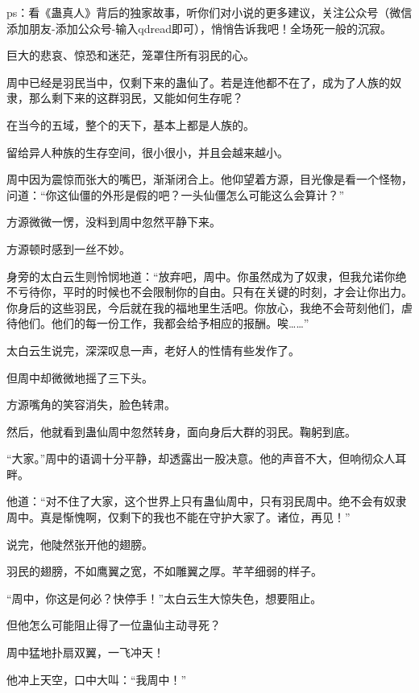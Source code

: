 
\begin{this_body}

ps：看《蛊真人》背后的独家故事，听你们对小说的更多建议，关注公众号（微信添加朋友-添加公众号-输入qdread即可），悄悄告诉我吧！全场死一般的沉寂。

巨大的悲哀、惊恐和迷茫，笼罩住所有羽民的心。

周中已经是羽民当中，仅剩下来的蛊仙了。若是连他都不在了，成为了人族的奴隶，那么剩下来的这群羽民，又能如何生存呢？

在当今的五域，整个的天下，基本上都是人族的。

留给异人种族的生存空间，很小很小，并且会越来越小。

周中因为震惊而张大的嘴巴，渐渐闭合上。他仰望着方源，目光像是看一个怪物，问道：“你这仙僵的外形是假的吧？一头仙僵怎么可能这么会算计？”

方源微微一愣，没料到周中忽然平静下来。

方源顿时感到一丝不妙。

身旁的太白云生则怜悯地道：“放弃吧，周中。你虽然成为了奴隶，但我允诺你绝不亏待你，平时的时候也不会限制你的自由。只有在关键的时刻，才会让你出力。你身后的这些羽民，今后就在我的福地里生活吧。你放心，我绝不会苛刻他们，虐待他们。他们的每一份工作，我都会给予相应的报酬。唉……”

太白云生说完，深深叹息一声，老好人的性情有些发作了。

但周中却微微地摇了三下头。

方源嘴角的笑容消失，脸色转肃。

然后，他就看到蛊仙周中忽然转身，面向身后大群的羽民。鞠躬到底。

“大家。”周中的语调十分平静，却透露出一股决意。他的声音不大，但响彻众人耳畔。

他道：“对不住了大家，这个世界上只有蛊仙周中，只有羽民周中。绝不会有奴隶周中。真是惭愧啊，仅剩下的我也不能在守护大家了。诸位，再见！”

说完，他陡然张开他的翅膀。

羽民的翅膀，不如鹰翼之宽，不如雕翼之厚。芊芊细弱的样子。

“周中，你这是何必？快停手！”太白云生大惊失色，想要阻止。

但他怎么可能阻止得了一位蛊仙主动寻死？

周中猛地扑扇双翼，一飞冲天！

他冲上天空，口中大叫：“我周中！”


\end{this_body}
